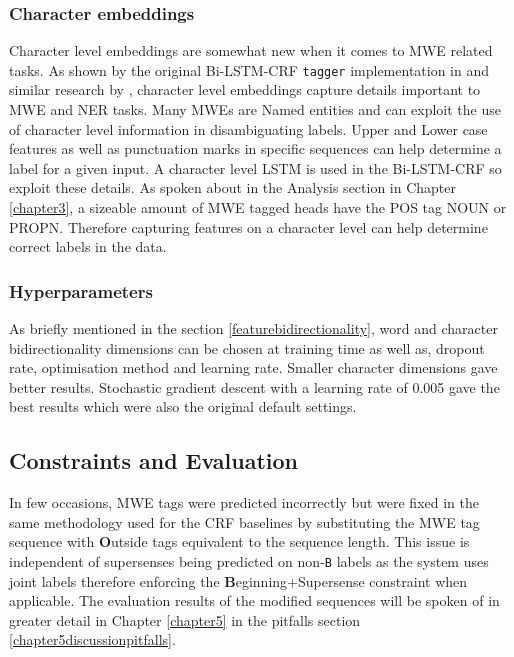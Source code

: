 \subsubsection{Character embeddings}
Character level embeddings are somewhat new when it comes to MWE related tasks. As shown by the original Bi-LSTM-CRF \texttt{tagger} implementation in \cite{Lample2016} and similar research by \cite{Chiu2015}, character level embeddings capture details important to MWE and NER tasks. Many MWEs are Named entities and can exploit the use of character level information in disambiguating labels. Upper and Lower case features as well as punctuation marks in specific sequences can help determine a label for a given input. 
A character level LSTM is used in the Bi-LSTM-CRF so exploit these details. As spoken about in the Analysis section in Chapter \ref{chapter3}, a sizeable amount of MWE tagged heads have the POS tag NOUN or PROPN. Therefore capturing features on a character level can help determine correct labels in the \dimsum data. 

\subsubsection{Hyperparameters}

As briefly mentioned in the section \ref{featurebidirectionality}, word and character bidirectionality dimensions can be chosen at training time as well as, dropout rate, optimisation method and learning rate. Smaller character dimensions gave better results. Stochastic gradient descent with a learning rate of 0.005 gave the best results which were also the original default settings.

\subsection{Constraints and Evaluation}

In few occasions, MWE tags were predicted incorrectly but were fixed in the same methodology used for the CRF baselines by substituting the MWE tag sequence with {\bf O}utside tags equivalent to the sequence length. This issue is independent of supersenses being predicted on non-\texttt{B} labels as the system uses joint labels therefore enforcing the {\bf B}eginning+Supersense constraint when applicable. The evaluation results of the modified sequences will be spoken of in greater detail in Chapter \ref{chapter5} in the pitfalls section \ref{chapter5discussionpitfalls}.
